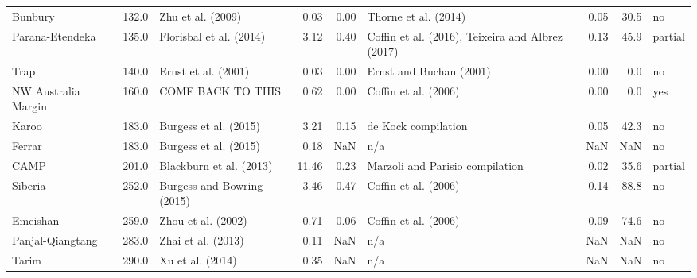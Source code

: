 \begin{tabular}{lrlrrlrrl}
             Bunbury &  132.0 &            Zhu et al. (2009) &                0.03 &               0.00 &                              Thorne et al. (2014) &              0.05 &       30.5 &       no \\
     Parana-Etendeka &  135.0 &      Florisbal et al. (2014) &                3.12 &               0.40 &  Coffin et al. (2016), Teixeira and Albrez (2017) &              0.13 &       45.9 &  partial \\
                Trap &  140.0 &          Ernst et al. (2001) &                0.03 &               0.00 &                           Ernst and Buchan (2001) &              0.00 &        0.0 &       no \\
 NW Australia Margin &  160.0 &            COME BACK TO THIS &                0.62 &               0.00 &                              Coffin et al. (2006) &              0.00 &        0.0 &      yes \\
               Karoo &  183.0 &        Burgess et al. (2015) &                3.21 &               0.15 &                               de Kock compilation &              0.05 &       42.3 &       no \\
              Ferrar &  183.0 &        Burgess et al. (2015) &                0.18 &                NaN &                                               n/a &               NaN &        NaN &       no \\
                CAMP &  201.0 &      Blackburn et al. (2013) &               11.46 &               0.23 &                   Marzoli and Parisio compilation &              0.02 &       35.6 &  partial \\
             Siberia &  252.0 &   Burgess and Bowring (2015) &                3.46 &               0.47 &                              Coffin et al. (2006) &              0.14 &       88.8 &       no \\
            Emeishan &  259.0 &           Zhou et al. (2002) &                0.71 &               0.06 &                              Coffin et al. (2006) &              0.09 &       74.6 &       no \\
    Panjal-Qiangtang &  283.0 &           Zhai et al. (2013) &                0.11 &                NaN &                                               n/a &               NaN &        NaN &       no \\
               Tarim &  290.0 &             Xu et al. (2014) &                0.35 &                NaN &                                               n/a &               NaN &        NaN &       no \\

\end{tabular}
